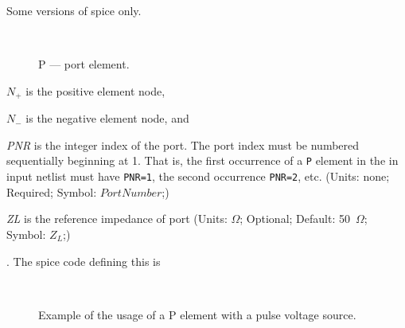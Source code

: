 
Some versions of spice only.

\begin{figure}[h]
\centering
\ 
\caption{P --- port element.\label{fig:port}}
\end{figure}

\begin{widelist}
\item[$N_{+}$] is the positive element node,
\item[$N_{-}$] is the negative element  node, and
\item[{\it PNR}] is the integer index of the port. The port index must be
numbered sequentially beginning at 1. That is, the first occurrence of a {\tt P}
element in the in input netlist must have {\tt PNR=1}, the second occurrence
{\tt PNR=2}, etc.
               (Units: none; Required; Symbol: $PortNumber$;)
\item[{\it ZL}] is the reference impedance of port
               (Units: $\Omega$; Optional; Default: 50~$\Omega$; Symbol: $Z_L$;)\\
\end{widelist}

. The spice code defining
this is 

\begin{figure}[h]
\centering
\ 
\caption{Example of the usage of a P element with a pulse voltage source.
\label{fig:port_source}}
\end{figure}
